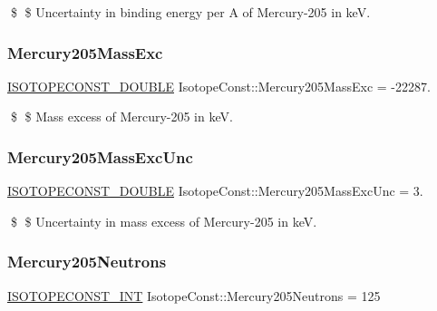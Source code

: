 \$ \$ Uncertainty in binding energy per A of Mercury-\/205 in keV. \mbox{\label{group___isotope_const-_mercury-_hg205_ga6d14bfaa5291d3c317ece51b5c20a688}} 
\subsubsection{\texorpdfstring{Mercury205\+Mass\+Exc}{Mercury205MassExc}}
{\footnotesize\ttfamily \mbox{\hyperlink{group___isotope_const-_macros_ga8f45a7272ce02c0b4c65c44636ed719a}{I\+S\+O\+T\+O\+P\+E\+C\+O\+N\+S\+T\+\_\+\+D\+O\+U\+B\+LE}} Isotope\+Const\+::\+Mercury205\+Mass\+Exc = -\/22287.}

\$ \$ Mass excess of Mercury-\/205 in keV. \mbox{\label{group___isotope_const-_mercury-_hg205_ga651fb3ced66d363781dc973dcf7a0a54}} 
\subsubsection{\texorpdfstring{Mercury205\+Mass\+Exc\+Unc}{Mercury205MassExcUnc}}
{\footnotesize\ttfamily \mbox{\hyperlink{group___isotope_const-_macros_ga8f45a7272ce02c0b4c65c44636ed719a}{I\+S\+O\+T\+O\+P\+E\+C\+O\+N\+S\+T\+\_\+\+D\+O\+U\+B\+LE}} Isotope\+Const\+::\+Mercury205\+Mass\+Exc\+Unc = 3.}

\$ \$ Uncertainty in mass excess of Mercury-\/205 in keV. \mbox{\label{group___isotope_const-_mercury-_hg205_ga79cc3fb626f1d44057ef34e01f2dd176}} 
\subsubsection{\texorpdfstring{Mercury205\+Neutrons}{Mercury205Neutrons}}
{\footnotesize\ttfamily \mbox{\hyperlink{group___isotope_const-_macros_ga5f18360b3e99483a35c32d789e62621c}{I\+S\+O\+T\+O\+P\+E\+C\+O\+N\+S\+T\+\_\+\+I\+NT}} Isotope\+Const\+::\+Mercury205\+Neutrons = 125}

